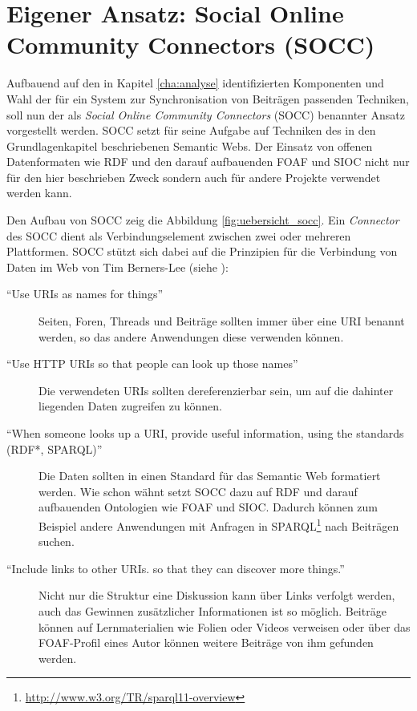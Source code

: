 
\chapter{Eigener Ansatz: Social Online Community Connectors (SOCC)} %
\label{cha:eigener_ansatz_social_online_community_connectors_socc_}

Aufbauend auf den in Kapitel \ref{cha:analyse} identifizierten Komponenten und Wahl der für ein System zur Synchronisation von Beiträgen passenden Techniken, soll nun der als \emph{Social Online Community Connectors} (SOCC) benannter Ansatz vorgestellt werden. SOCC setzt für seine Aufgabe auf Techniken des in den Grundlagenkapitel beschriebenen Semantic Webs. Der Einsatz von offenen Datenformaten wie RDF und den darauf aufbauenden FOAF und SIOC nicht nur für den hier beschrieben Zweck sondern auch für andere Projekte verwendet werden kann. 

Den Aufbau von SOCC zeig die Abbildung \ref{fig:uebersicht_socc}. Ein \emph{Connector} des SOCC dient als Verbindungselement zwischen zwei oder mehreren Plattformen. SOCC stützt sich dabei auf die Prinzipien für die Verbindung von Daten im Web von Tim Berners-Lee (siehe \cite{Berners-Lee2009}):

\begin{description}
    \item[\enquote{Use URIs as names for things}] Seiten, Foren, Threads und Beiträge sollten immer über eine URI benannt werden, so das andere Anwendungen diese verwenden können.

    \item[\enquote{Use HTTP URIs so that people can look up those names}] Die verwendeten URIs sollten dereferenzierbar sein, um auf die dahinter liegenden Daten zugreifen zu können.

    \item[\enquote{When someone looks up a URI, provide useful information, using the standards (RDF*, SPARQL)}] Die Daten sollten in einen Standard für das Semantic Web formatiert werden. Wie schon wähnt setzt SOCC dazu auf RDF und darauf aufbauenden Ontologien wie FOAF und SIOC. Dadurch können zum Beispiel andere Anwendungen mit Anfragen in SPARQL\footnote{\url{http://www.w3.org/TR/sparql11-overview}} nach Beiträgen suchen.

    \item[\enquote{Include links to other URIs. so that they can discover more things.}] Nicht nur die Struktur eine Diskussion kann über Links verfolgt werden, auch das Gewinnen zusätzlicher Informationen ist so möglich. Beiträge können auf Lernmaterialien wie Folien oder Videos verweisen oder über das FOAF-Profil eines Autor können weitere Beiträge von ihm gefunden werden. 
\end{description}

